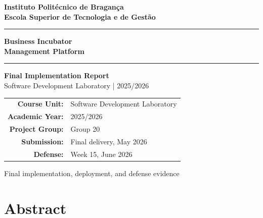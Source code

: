 \documentclass[12pt,a4paper]{report}
\begin{document}
\begin{titlepage}
  \begin{center}
    \vspace*{1.4cm}

    {\Large\bfseries\color{IPBblue}
      Instituto Politécnico de Bragança\\[4pt]
      Escola Superior de Tecnologia e de Gestão}

    \vspace{1.4cm}
    \rule{\linewidth}{1.5pt}
    \vspace{0.5cm}

    {\Huge\bfseries Business Incubator\\[8pt] Management Platform}

    \vspace{0.4cm}
    \rule{\linewidth}{0.5pt}
    \vspace{1.2cm}

    {\Large\bfseries Final Implementation Report}\\[0.5cm]
    {\large Software Development Laboratory | 2025/2026}

    \vfill

    \begin{tabular}{rl}
      \textbf{Course Unit:}   & Software Development Laboratory \\[4pt]
      \textbf{Academic Year:} & 2025/2026 \\[4pt]
      \textbf{Project Group:} & Group 20 \\[4pt]
      \textbf{Submission:}    & Final delivery, May 2026 \\[4pt]
      \textbf{Defense:}       & Week 15, June 2026
    \end{tabular}

    \vspace{2cm}
    {\small\color{IPBgray} Final implementation, deployment, and defense evidence}
  \end{center}
\end{titlepage}


\chapter*{Abstract}
\end{document}
